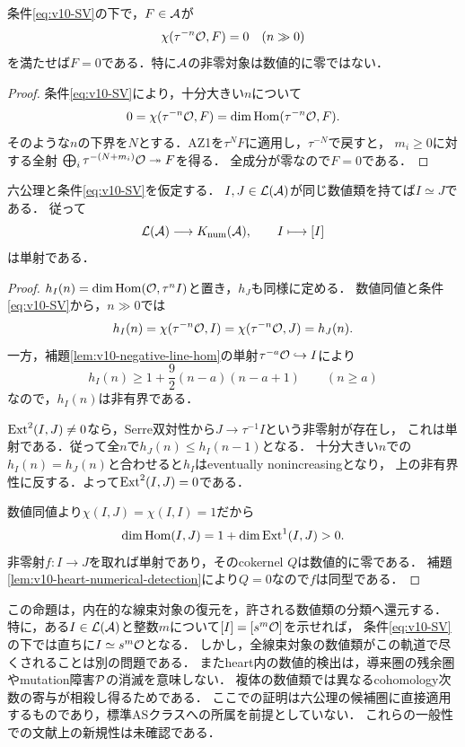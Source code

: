 \documentclass[11pt,a4paper]{ltjsarticle}
\begin{document}
\begin{lemma}[heartの正の対象は数値的に消えない]
\label{lem:v10-heart-numerical-detection}
条件\eqref{eq:v10-SV}の下で，$F\in\mathcal A$が
\[
 \chi(\tau^{-n}\mathcal O,F)=0\quad(n\gg0)
\]
を満たせば$F=0$である．特に$\mathcal A$の非零対象は数値的に零ではない．
\end{lemma}
\begin{proof}
条件\eqref{eq:v10-SV}により，十分大きい$n$について
\[
 0=\chi(\tau^{-n}\mathcal O,F)
   =\dim\operatorname{Hom}(\tau^{-n}\mathcal O,F).
\]
そのような$n$の下界を$N$とする．AZ1を$\tau^N F$に適用し，$\tau^{-N}$で戻すと，
$m_i\geq0$に対する全射
$\bigoplus_i\tau^{-(N+m_i)}\mathcal O\twoheadrightarrow F$を得る．
全成分が零なので$F=0$である．
\end{proof}

\begin{proposition}[線束対象の数値類による一意性]
\label{prop:v10-numerical-line-rigidity}
六公理と条件\eqref{eq:v10-SV}を仮定する．
$I,J\in\mathcal L(\mathcal A)$が同じ数値類を持てば$I\simeq J$である．
従って
\[
 \mathcal L(\mathcal A)\longrightarrow K_{\mathrm{num}}(\mathcal A),\qquad I\longmapsto[I]
\]
は単射である．
\end{proposition}
\begin{proof}
$h_I(n)=\dim\operatorname{Hom}(\mathcal O,\tau^nI)$と置き，$h_J$も同様に定める．
数値同値と条件\eqref{eq:v10-SV}から，$n\gg0$では
\[
 h_I(n)=\chi(\tau^{-n}\mathcal O,I)
       =\chi(\tau^{-n}\mathcal O,J)=h_J(n).
\]
一方，補題\ref{lem:v10-negative-line-hom}の単射$\tau^{-a}\mathcal O\hookrightarrow I$により
\[
 h_I(n)\geq 1+\frac92(n-a)(n-a+1)\qquad(n\geq a)
\]
なので，$h_I(n)$は非有界である．

$\operatorname{Ext}^2(I,J)\ne0$なら，Serre双対性から$J\to\tau^{-1}I$という非零射が存在し，
これは単射である．従って全$n$で$h_J(n)\leq h_I(n-1)$となる．
十分大きい$n$での$h_I(n)=h_J(n)$と合わせると$h_I$はeventually nonincreasingとなり，
上の非有界性に反する．よって$\operatorname{Ext}^2(I,J)=0$である．

数値同値より$\chi(I,J)=\chi(I,I)=1$だから
\[
 \dim\operatorname{Hom}(I,J)=1+\dim\operatorname{Ext}^1(I,J)>0.
\]
非零射$f:I\to J$を取れば単射であり，そのcokernel $Q$は数値的に零である．
補題\ref{lem:v10-heart-numerical-detection}により$Q=0$なので$f$は同型である．
\end{proof}

\begin{remark}[数値的一意性が解決する範囲]
この命題は，内在的な線束対象の復元を，許される数値類の分類へ還元する．
特に，ある$I\in\mathcal L(\mathcal A)$と整数$m$について$[I]=[s^m\mathcal O]$を示せれば，
条件\eqref{eq:v10-SV}の下では直ちに$I\simeq s^m\mathcal O$となる．
しかし，全線束対象の数値類がこの軌道で尽くされることは別の問題である．
またheart内の数値的検出は，導来圏の残余圏やmutation障害$\mathcal P$の消滅を意味しない．
複体の数値類では異なるcohomology次数の寄与が相殺し得るためである．
ここでの証明は六公理の候補圏に直接適用するものであり，標準ASクラスへの所属を前提としていない．
これらの一般性での文献上の新規性は未確認である．
\end{remark}
\end{document}
